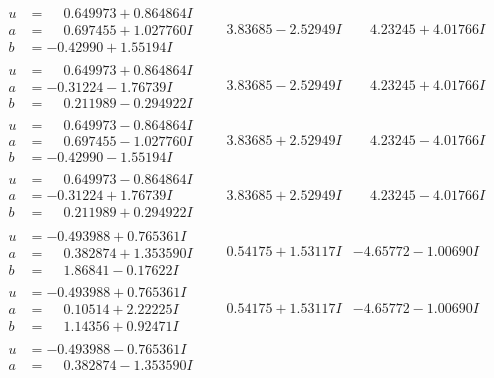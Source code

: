 \documentclass[1p]{elsarticle_modified}
\theoremstyle{definition}
\begin{document}
$$\begin{array}{c|c|c}
\begin{aligned}
u &= \phantom{-}0.649973 + 0.864864 I \\
a &= \phantom{-}0.697455 + 1.027760 I \\
b &= -0.42990 + 1.55194 I\end{aligned}
 & \phantom{-}3.83685 - 2.52949 I & \phantom{-}4.23245 + 4.01766 I \\ \hline\begin{aligned}
u &= \phantom{-}0.649973 + 0.864864 I \\
a &= -0.31224 - 1.76739 I \\
b &= \phantom{-}0.211989 - 0.294922 I\end{aligned}
 & \phantom{-}3.83685 - 2.52949 I & \phantom{-}4.23245 + 4.01766 I \\ \hline\begin{aligned}
u &= \phantom{-}0.649973 - 0.864864 I \\
a &= \phantom{-}0.697455 - 1.027760 I \\
b &= -0.42990 - 1.55194 I\end{aligned}
 & \phantom{-}3.83685 + 2.52949 I & \phantom{-}4.23245 - 4.01766 I \\ \hline\begin{aligned}
u &= \phantom{-}0.649973 - 0.864864 I \\
a &= -0.31224 + 1.76739 I \\
b &= \phantom{-}0.211989 + 0.294922 I\end{aligned}
 & \phantom{-}3.83685 + 2.52949 I & \phantom{-}4.23245 - 4.01766 I \\ \hline\begin{aligned}
u &= -0.493988 + 0.765361 I \\
a &= \phantom{-}0.382874 + 1.353590 I \\
b &= \phantom{-}1.86841 - 0.17622 I\end{aligned}
 & \phantom{-}0.54175 + 1.53117 I & -4.65772 - 1.00690 I \\ \hline\begin{aligned}
u &= -0.493988 + 0.765361 I \\
a &= \phantom{-}0.10514 + 2.22225 I \\
b &= \phantom{-}1.14356 + 0.92471 I\end{aligned}
 & \phantom{-}0.54175 + 1.53117 I & -4.65772 - 1.00690 I \\ \hline\begin{aligned}
u &= -0.493988 - 0.765361 I \\
a &= \phantom{-}0.382874 - 1.353590 I \\

\end{aligned}
\end{array}$$
\end{document}
